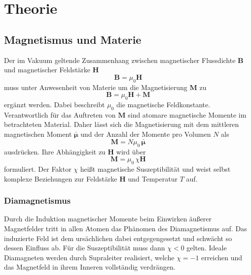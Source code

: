 \section[Theorie]{Theorie \textnormal{\cite{paramagnet}}}
\label{sec:theorie}

\subsection{Magnetismus und Materie}

Der im Vakuum geltende Zusammenhang zwischen magnetischer Flussdichte $\symbf B$ und magnetischer Feldstärke $\symbf H$
\begin{equation*}
	\symbf B = \mu_0 \symbf H
	\label{eqn:vakuum}
\end{equation*}
muss unter Anwesenheit von Materie um die Magnetisierung $\symbf M$ zu
\begin{equation*}
	\symbf B = \mu_0 \symbf H + \symbf M
	\label{eqn:materie}
\end{equation*}
ergänzt werden. Dabei beschreibt $\mu_0$ die magnetische Feldkonstante. Verantwortlich für das Auftreten von $\symbf M$
sind atomare magnetische Momente im betrachteten Material. Daher lässt sich die Magnetisierung mit dem mittleren
magnetischen Moment $\bar{\symbf \mu}$ und der Anzahl der Momente pro Volumen $N$ als
\begin{equation*}
	\symbf M = N \mu_0 \, \bar{\symbf \mu}
	\label{eqn:magnet_moment}
\end{equation*}
ausdrücken. Ihre Abhängigkeit zu $\symbf H$ wird über
\begin{equation*}
	\symbf M = \mu_0 \, \chi \symbf H
	\label{eqn:magnet_feld}
\end{equation*}
formuliert. Der Faktor $\chi$ heißt magnetische Suszeptibilität und weist selbst komplexe Beziehungen zur Feldstärke
$\symbf H$ und Temperatur $T$ auf.

\subsubsection{Diamagnetismus}

Durch die Induktion magnetischer Momente beim Einwirken äußerer Magnetfelder tritt in allen Atomen das Phänomen des
Diamagnetismus auf. Das induzierte Feld ist dem ursächlichen dabei entgegengesetzt und schwächt so dessen Einfluss ab.
Für die Suszeptibilität muss dann $\chi < 0 $ gelten. Ideale Diamagneten werden durch Supraleiter realisiert, welche
$\chi = -1$ erreichen und das Magnetfeld in ihrem Inneren vollständig verdrängen.

